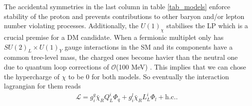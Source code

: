 The accidental symmetries in the last column in table \ref{tab_models}
enforce stability of the proton and prevents contributions to other baryon and/or lepton number violating
processes. Additionally, the $U(1)_\chi$ stabilises the LP which is a crucial premise for a DM candidate. 
When a fermionic multiplet only has $SU(2)_L\times U(1)_Y$ gauge interactions in the SM and its components have a common tree-level mass, the charged 
ones become havier than the neutral one due to quantum loop corrections of $\mathcal{O}$(100 MeV) \cite{Hisano}\cite{minMatter}. This implies that we 
can chose the hypercharge of $\chi$ to be 0 for both models. So eventually the interaction lagrangian for them reads
\begin{align}
 \mathcal{L} = g_i^q \bar \chi_R Q_L^i \Phi_q + g_i^l \bar \chi_R L_L^i \Phi_l + \text{h.c.}.
 \label{eq_modelLagrangian}
\end{align}
